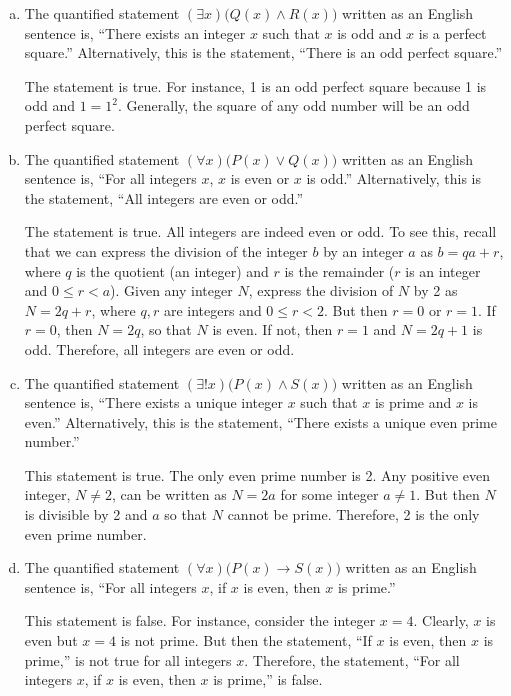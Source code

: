 \documentclass[11pt,letterpaper]{article}
\begin{document}
\sol 
\begin{enumerate}[(a)]
\item The quantified statement $(\exists x) \big( Q(x) \wedge R(x) \big)$ written as an English sentence is, ``There exists an integer $x$ such that $x$ is odd and $x$ is a perfect square.'' Alternatively, this is the statement, ``There is an odd perfect square.'' \pspace

The statement is true. For instance, 1 is an odd perfect square because 1 is odd and $1= 1^2$. Generally, the square of any odd number will be an odd perfect square. \pspace

\item The quantified statement $(\forall x) \big( P(x) \vee Q(x) \big)$ written as an English sentence is, ``For all integers $x$, $x$ is even or $x$ is odd.'' Alternatively, this is the statement, ``All integers are even or odd.'' \pspace

The statement is true. All integers are indeed even or odd. To see this, recall that we can express the division of the integer $b$ by an integer $a$ as $b= qa + r$, where $q$ is the quotient (an integer) and $r$ is the remainder ($r$ is an integer and $0 \leq r < a$). Given any integer $N$, express the division of $N$ by 2 as $N= 2q + r$, where $q, r$ are integers and $0 \leq r < 2$. But then $r= 0$ or $r= 1$. If $r= 0$, then $N= 2q$, so that $N$ is even. If not, then $r= 1$ and $N= 2q + 1$ is odd. Therefore, all integers are even or odd. \pspace

\item The quantified statement $(\exists! x) \big( P(x) \wedge S(x) \big)$ written as an English sentence is, ``There exists a unique integer $x$ such that $x$ is prime and $x$ is even.'' Alternatively, this is the statement, ``There exists a unique even prime number.'' \pspace

This statement is true. The only even prime number is 2. Any positive even integer, $N \neq 2$, can be written as $N= 2a$ for some integer $a \neq 1$. But then $N$ is divisible by 2 and $a$ so that $N$ cannot be prime. Therefore, 2 is the only even prime number. \pspace

\item The quantified statement $(\forall x) \big( P(x) \to S(x) \big)$ written as an English sentence is, ``For all integers $x$, if $x$ is even, then $x$ is prime.'' \pspace

This statement is false. For instance, consider the integer $x= 4$. Clearly, $x$ is even but $x= 4$ is not prime. But then the statement, ``If $x$ is even, then $x$ is prime,'' is not true for all integers $x$. Therefore, the statement, ``For all integers $x$, if $x$ is even, then $x$ is prime,'' is false. \pspace


\end{enumerate}
\end{document}
